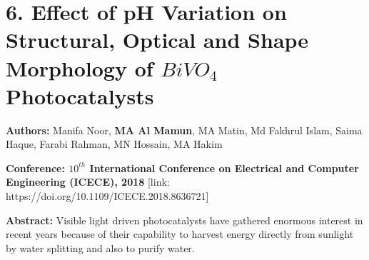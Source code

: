 \documentclass[a4paper,20pt]{article}
\begin{document}
\vspace{5pt}
\section{\textbf{6. Effect of pH Variation on Structural, Optical and Shape Morphology of $BiVO_4$ Photocatalysts}}

\textbf{Authors:} Manifa Noor, \textbf{MA Al Mamun}, MA Matin, Md Fakhrul Islam, Saima Haque, Farabi Rahman, MN Hossain, MA Hakim \\ \vspace{3pt}

\textbf{Conference: $10^{th}$ International Conference on Electrical and Computer Engineering (ICECE), 2018} [link: https://doi.org/10.1109/ICECE.2018.8636721] \\ \vspace{5pt}

\textbf{Abstract:} Visible light driven photocatalysts have gathered enormous interest in recent years because of their capability to harvest energy directly from sunlight by water splitting and also to purify water. \\ \vspace{2pt} 
\end{document}
